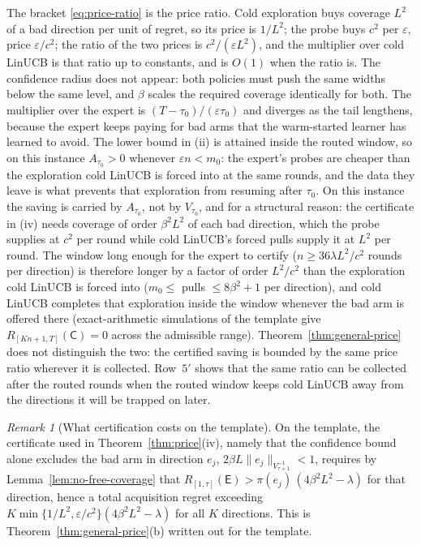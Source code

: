 \documentclass{article}
\theoremstyle{definition}
\theoremstyle{remark}
\newtheorem{remark}{Remark}
\newcommand{\eps}{\varepsilon}
\theoremstyle{remark}
\newcommand{\Cold}{\mathsf{C}}
\newcommand{\Exp}{\mathsf{E}}
\begin{document}
The bracket \eqref{eq:price-ratio} is the price ratio. Cold exploration buys
coverage $L^2$ of a bad direction per unit of regret, so its price is $1/L^2$;
the probe buys $c^2$ per $\eps$, price $\eps/c^2$; the ratio of the two prices
is $c^2/(\eps L^2)$, and the multiplier over cold LinUCB is that ratio up to
constants, and is $O(1)$ when the ratio is. The confidence radius does not
appear: both policies must push the same widths below the same level, and
$\beta$ scales the required coverage identically for both. The multiplier
over the expert is $(T-\tau_0)/(\eps\tau_0)$ and diverges as the tail
lengthens, because the expert keeps paying for bad arms that the warm-started
learner has learned to avoid. The lower bound in (ii) is attained inside the
routed window, so on this instance $A_{\tau_0}>0$ whenever $\eps n<m_0$: the
expert's probes are cheaper than the exploration cold LinUCB is forced into
at the same rounds, and the data they leave is what prevents that exploration
from resuming after $\tau_0$. On this instance the saving is carried by
$A_{\tau_0}$, not by $V_{\tau_0}$, and for a structural reason: the
certificate in (iv) needs coverage of order $\beta^2L^2$ of each bad
direction, which the probe supplies at $c^2$ per round while cold LinUCB's
forced pulls supply it at $L^2$ per round. The window long enough for the
expert to certify ($n\ge36\lambda L^2/c^2$ rounds per direction) is therefore
longer by a factor of order $L^2/c^2$ than the exploration cold LinUCB is
forced into ($m_0\le$ pulls $\le 8\beta^2+1$ per direction), and cold LinUCB
completes that exploration inside the window whenever the bad arm is offered
there (exact-arithmetic simulations of the template give
$R_{[Kn+1,T]}(\Cold)=0$ across the admissible range). Theorem~\ref{thm:general-price}
does not distinguish the two: the certified saving is bounded by the
same price ratio wherever it is collected. Row~$5'$ shows that the same ratio
can be collected after the routed rounds when the routed window keeps cold
LinUCB away from the directions it will be trapped on later.

\begin{remark}[What certification costs on the template]
On the template, the certificate used in Theorem~\ref{thm:price}(iv), namely
that the confidence bound alone excludes the bad arm in direction $e_j$,
$2\beta L\|e_j\|_{V_{\tau+1}^{-1}}<1$, requires by
Lemma~\ref{lem:no-free-coverage} that
$R_{[1,\tau]}(\Exp)>\pi(e_j)\,(4\beta^2L^2-\lambda)$ for that direction, hence
a total acquisition regret exceeding
$K\min\{1/L^2,\eps/c^2\}(4\beta^2L^2-\lambda)$ for all $K$ directions. This is
Theorem~\ref{thm:general-price}(b) written out for the template.
\end{remark}
\end{document}
